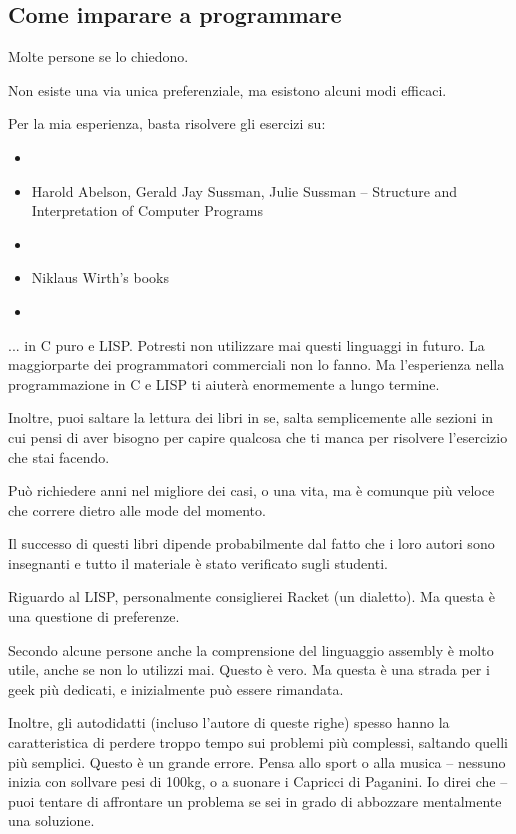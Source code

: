 



\subsection*{Come imparare a programmare}

Molte persone se lo chiedono.

Non esiste una via unica preferenziale, ma esistono alcuni modi efficaci.

Per la mia esperienza, basta risolvere gli esercizi su:

\begin{itemize}
\item \KRBook
\item Harold Abelson, Gerald Jay Sussman, Julie Sussman -- Structure and Interpretation of Computer Programs
\item \TAOCP
\item Niklaus Wirth's books
\item \RobPikePractice
\end{itemize}

... in C puro e LISP.
Potresti non utilizzare mai questi linguaggi in futuro.
La maggiorparte dei programmatori commerciali non lo fanno. Ma l'esperienza nella programmazione in C e LISP ti aiuterà enormemente a lungo termine.

Inoltre, puoi saltare la lettura dei libri in se,
salta semplicemente alle sezioni in cui pensi di aver bisogno per capire qualcosa che ti manca per risolvere l'esercizio che stai facendo.

Può richiedere anni nel migliore dei casi, o una vita, ma è comunque più veloce che correre dietro alle mode del momento.

Il successo di questi libri dipende probabilmente dal fatto che i loro autori sono insegnanti
e tutto il materiale è stato verificato sugli studenti.

Riguardo al LISP, personalmente consiglierei Racket (un dialetto). Ma questa è una questione di preferenze.

Secondo alcune persone anche la comprensione del linguaggio assembly è molto utile, anche se non lo utilizzi mai.
Questo è vero.
Ma questa è una strada per i geek più dedicati, e inizialmente può essere rimandata.

Inoltre, gli autodidatti (incluso l'autore di queste righe) spesso hanno la caratteristica di perdere troppo tempo sui problemi più complessi,
saltando quelli più semplici.
Questo è un grande errore.
Pensa allo sport o alla musica -- nessuno inizia con sollvare pesi di 100kg, o a suonare i Capricci di Paganini.
Io direi che -- puoi tentare di affrontare un problema se sei in grado di abbozzare mentalmente una soluzione.

